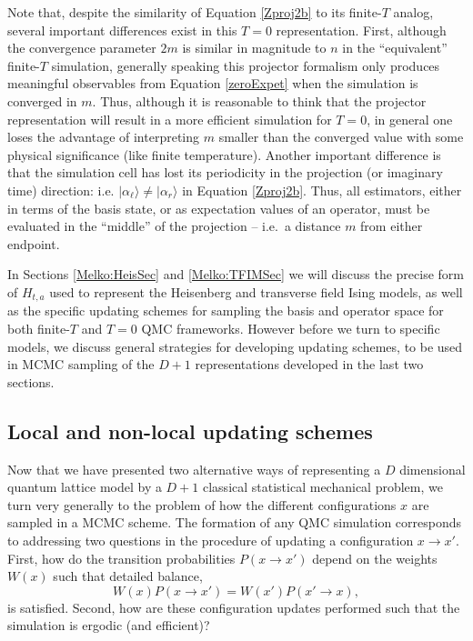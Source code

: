 \documentclass[vecphys]{svmult}
\begin{document}
Note that, despite the similarity of Equation \ref{Zproj2b} to its finite-$T$ analog, several important differences exist in this $T=0$ representation.  First, although the convergence parameter $2m$ is similar in magnitude to $n$ in the ``equivalent'' finite-$T$ simulation, 
generally speaking this projector formalism only produces meaningful observables from Equation \ref{zeroExpet} when the simulation is converged in $m$.  Thus, although it is reasonable to think that the projector representation will result in a more efficient simulation for $T=0$, in general one loses the advantage of interpreting $m$ smaller than the converged value with some physical significance (like finite temperature).
Another important difference is that the simulation cell has lost its periodicity in the projection (or imaginary time) direction: i.e. $| \alpha_{\ell} \rangle \neq | \alpha_r \rangle$ in Equation \ref{Zproj2b}.  Thus, all estimators, either in terms of the basis state, or as expectation values of an operator, must be evaluated in the ``middle'' of the projection -- i.e.~a distance $m$ from either endpoint.

In Sections \ref{Melko:HeisSec} and \ref{Melko:TFIMSec} we will discuss the precise form of $H_{t,a}$ used to represent the Heisenberg and transverse field Ising models, as well as the specific updating schemes for sampling the basis and operator space for both finite-$T$ and $T=0$ QMC frameworks.  However before we turn to specific models, we discuss general strategies for developing updating schemes, to be used in MCMC sampling of the $D+1$ representations developed in the last two sections.


\subsection{Local and non-local updating schemes} \label{Melko:updates}

Now that we have presented two alternative ways of representing a $D$ dimensional quantum lattice model by a $D+1$ classical statistical mechanical problem, we turn very generally to the problem of how the different configurations $x$ are sampled in a MCMC scheme.
The formation of any QMC simulation corresponds to addressing two questions in the procedure of updating a configuration $x \rightarrow x'$. First, how do the transition probabilities $P(x \rightarrow x')$ depend on the weights $W(x)$ such that detailed balance,
\begin{equation}
 W(x)P(x \rightarrow x') = W(x')P(x' \rightarrow x), \label{detb}
 \end{equation}
 is satisfied. Second, how are these configuration updates performed such that the simulation is ergodic (and efficient)?
\end{document}
